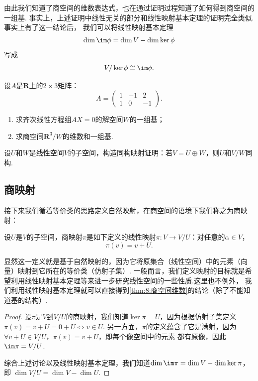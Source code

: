 由此我们知道了商空间的维数表达式，也在通过证明过程知道了如何得到商空间的一组基.
事实上，上述证明中线性无关的部分和线性映射基本定理的证明完全类似.事实上有了这一结论后，
我们可以将线性映射基本定理
\[\dim\im\phi=\dim V-\dim\ker\phi\]
写成
\[V/\ker\phi\cong\im\phi.\]

\begin{example}
	设$A$是$\mathbf{R}$上的$2\times 3$矩阵：
	$$A=\begin{pmatrix}
		1 & -1 & 2 \\ 1 & 0 & -1
	\end{pmatrix}.$$
    \begin{enumerate}[label=(\arabic*)]
        \item 求齐次线性方程组$AX=0$的解空间$W$的一组基；
        \item 求商空间$\mathbf{R}^3/W$的维数和一组基.
    \end{enumerate}
\end{example}
\begin{solution}

\end{solution}

\begin{example}
	设$U$和$W$是线性空间$V$的子空间，构造同构映射证明：若$V=U\oplus W$，则$U$和$V/W$同构.
\end{example}
\begin{solution}

\end{solution}

\subsection{商映射}
接下来我们循着等价类的思路定义自然映射，在商空间的语境下我们称之为商映射：
\begin{definition}
	设$U$是$V$的子空间，商映射$\pi$是如下定义的线性映射$\pi:V\to V/U$：对任意的$\alpha\in V$，
	$$\pi(v)=v+U.$$
\end{definition}
显然这一定义就是基于自然映射的，因为它将原集合（线性空间）中的元素（向量）映射到它所在的等价类（仿射子集）.
一般而言，我们定义映射的目标就是希望利用线性映射基本定理等来进一步研究线性空间的一些性质.这里也不例外，
我们利用线性映射基本定理就可以直接得到\autoref{thm:8:商空间维数}的结论（除了不能知道基的结构）.

\begin{proof}
    设$\pi$是$V$到$V/U$的商映射，我们知道$\ker\pi=U$，因为根据仿射子集定义$\pi(v)=v+U=0+U\iff v\in U$.
    另一方面，$\pi$的定义蕴含了它是满射，因为$\forall v+U\in V/U$，$\pi(v)=v+U$，即每个像空间中的元素
    都有原像，因此$\im\pi=V/U$.

    综合上述讨论以及线性映射基本定理，我们知道$\dim\im\pi=\dim V-\dim\ker\pi$，即
    $\dim V/U=\dim V-\dim U$.
\end{proof}

